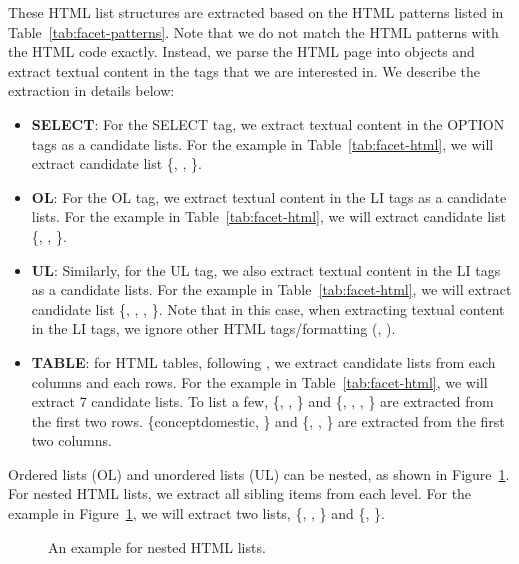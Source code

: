 These HTML list structures are extracted based on the HTML patterns listed in Table~\ref{tab:facet-patterns}. Note that we do not match the HTML patterns with the HTML code exactly. Instead, we parse the HTML page into objects and extract textual content in the tags that we are interested in. We describe the extraction in details below:
\begin{itemize}
 \item \textbf{SELECT}: For the SELECT tag, we extract textual content in the OPTION tags as a candidate lists. For the example in Table~\ref{tab:facet-html}, we will extract candidate list \{, , \}.
\item \textbf{OL}: For the OL tag, we extract textual content in the LI tags as a candidate lists. For the example in Table~\ref{tab:facet-html}, we will extract candidate list \{, , \}.
\item \textbf{UL}: Similarly, for the UL tag, we also extract textual content in the LI tags as a candidate lists. For the example in Table~\ref{tab:facet-html}, we will extract candidate list \{, , , \}. Note that in this case, when extracting textual content in the LI tags, we ignore other HTML tags/formatting (\ie, ).
\item \textbf{TABLE}: for HTML tables, following \citet{dou2011finding}, we extract candidate lists from each columns and each rows. For the example in Table~\ref{tab:facet-html}, we will extract 7 candidate lists.
To list a few, \{, , \} and \{, , , \} are extracted from the first two rows. \{concept{domestic}, \} and \{, , \} are extracted from the first two columns.
\end{itemize}


Ordered lists (OL) and unordered lists (UL) can be nested, as shown in Figure~\ref{fig:nestedlist}. For nested HTML lists, we extract all sibling items from each level. For the example in Figure~\ref{fig:nestedlist}, we will extract two lists,
\{, , \} and \{, \}.
\begin{figure}[!ht]
\centering
{}
\caption{An example for nested HTML lists.}
\label{fig:nestedlist}
\end{figure}

